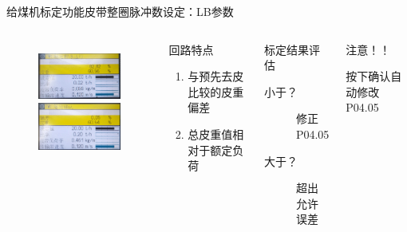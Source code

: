 \documentclass[12pt,hyperref={CJKbookmarks=true}]{beamer} %
\begin{document}
\begin{frame}{给煤机标定功能}{皮带整圈脉冲数设定：LB参数}
  		\begin{columns}
\begin{figure}
\includegraphics[angle=0,width=150pt,trim=0 0 0 0,clip]{picture/TWing.jpg}\\
\includegraphics[angle=0,width=150pt,trim=0 0 0 0,clip]{picture/TWed.jpg}
	
\end{figure}
\begin{block}{回路特点}
			\begin{enumerate}
				\item  与预先去皮比较的皮重偏差
				\item  总皮重值相对于额定负荷
				\end{enumerate}
\end{block}
\begin{exampleblock}{标定结果评估}
			\begin{description}
				\item[小于？]修正P04.05
				\item[大于？]超出允许误差
				\end{description}
\end{exampleblock}
\begin{alertblock}{注意！！}
			
				按下确认自动修改P04.05
\end{alertblock}
		\end{columns}
	\end{frame}
\end{document}
